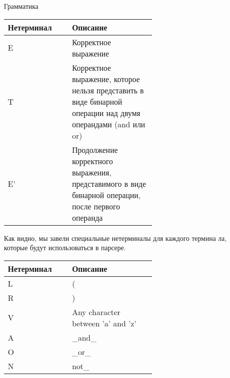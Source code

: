 \begin{para}{Грамматика}
\begin{table}[h]
\begin{center}
\begin{tabular}{|p{0.2\linewidth}|p{0.4\linewidth}|} 

\hline
\textbf{Нетерминал} & \textbf{Описание}\\
\hline
E & Корректное выражение\\
\hline
T & Корректное выражение, которое нельзя представить в виде бинарной операции над двумя операндами (and или or)\\
\hline
E' & Продолжение корректного выражения, представимого в виде бинарной операции, после первого операнда\\
\hline

\end{tabular}

\end{center}

\end{table}

Как видно, мы завели специальные нетерминалы для каждого термина
ла, которые будут использоваться в парсере.

\begin{table}[h]

\begin{center}

\begin{tabular}{|p{0.2\linewidth}|p{0.4\linewidth}|} 

\hline
\textbf{Нетерминал} & \textbf{Описание}\\
\hline
L & (\\
\hline
R & )\\
\hline
V & Any character between 'a' and 'z'\\
\hline
A & \_and\_\\
\hline
O & \_or\_\\
\hline
N & not\_\\
\hline

\end{tabular}

\end{center}

\end{table}

\end{para}

\newpage

